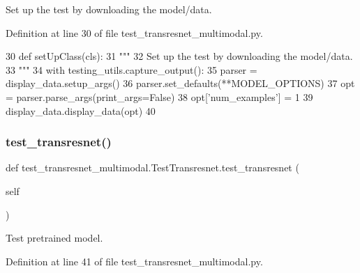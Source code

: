 \begin{DoxyVerb}Set up the test by downloading the model/data.
\end{DoxyVerb}
 

Definition at line 30 of file test\+\_\+transresnet\+\_\+multimodal.\+py.


\begin{DoxyCode}
30     \textcolor{keyword}{def }setUpClass(cls):
31         \textcolor{stringliteral}{"""}
32 \textcolor{stringliteral}{        Set up the test by downloading the model/data.}
33 \textcolor{stringliteral}{        """}
34         with testing\_utils.capture\_output():
35             parser = display\_data.setup\_args()
36             parser.set\_defaults(**MODEL\_OPTIONS)
37             opt = parser.parse\_args(print\_args=\textcolor{keyword}{False})
38             opt[\textcolor{stringliteral}{'num\_examples'}] = 1
39             display\_data.display\_data(opt)
40 
\end{DoxyCode}
\mbox{\label{classtest__transresnet__multimodal_1_1TestTransresnet_a812e5b711af8dfc4edd18dd4862928d5}} 
\subsubsection{\texorpdfstring{test\+\_\+transresnet()}{test\_transresnet()}}
{\footnotesize\ttfamily def test\+\_\+transresnet\+\_\+multimodal.\+Test\+Transresnet.\+test\+\_\+transresnet (\begin{DoxyParamCaption}\item[{}]{self }\end{DoxyParamCaption})}

\begin{DoxyVerb}Test pretrained model.
\end{DoxyVerb}
 

Definition at line 41 of file test\+\_\+transresnet\+\_\+multimodal.\+py.


